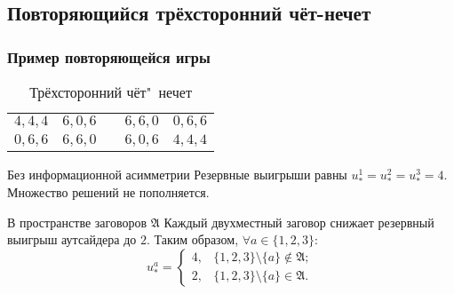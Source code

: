 \subsection{Повторяющийся трёхсторонний чёт-нечет}

\begin{frame}
	\frametitle{Пример повторяющейся игры}
	\begin{table} [htbp]
		\centering
		\begin{threeparttable}
			\caption{Трёхсторонний чёт"~нечет}
			\begin{tabular}{ |c|c|c|c|c| }
				\cline{1-2} \cline{4-5}
				\rule[-7pt]{0pt}{2em}$4, 4, 4$ &
				\rule[-7pt]{0pt}{2em}$6, 0, 6$ & \qquad\qquad\qquad &
				\rule[-7pt]{0pt}{2em}$6, 6, 0$ &
				\rule[-7pt]{0pt}{2em}$0, 6, 6$ \\
				\cline{1-2} \cline{4-5}
				\rule[-7pt]{0pt}{2em}$0, 6, 6$ &
				\rule[-7pt]{0pt}{2em}$6, 6, 0$ & \qquad\qquad\qquad &
				\rule[-7pt]{0pt}{2em}$6, 0, 6$ &
				\rule[-7pt]{0pt}{2em}$4, 4, 4$ \\
				\cline{1-2} \cline{4-5}
			\end{tabular}
		\end{threeparttable}
	\end{table}
	\begin{block}{Без информационной асимметрии}
		Резервные выигрыши равны $u^1_* = u^2_* = u^3_* = 4$. Множество решений не пополняется.
	\end{block}
	\begin{block}{В пространстве заговоров $\mathfrak{A}$}
		Каждый двухместный заговор снижает резервный выигрыш аутсайдера до $2$. Таким образом, $\forall a \in \{1, 2, 3\}$:
		\begin{equation*}
			u^a_* = \begin{cases}
				4, & \{1, 2, 3\} \setminus \{a\} \notin \mathfrak{A};\\
				2, & \{1, 2, 3\} \setminus \{a\} \in \mathfrak{A}.
			\end{cases}
		\end{equation*}
	\end{block}
\end{frame}

